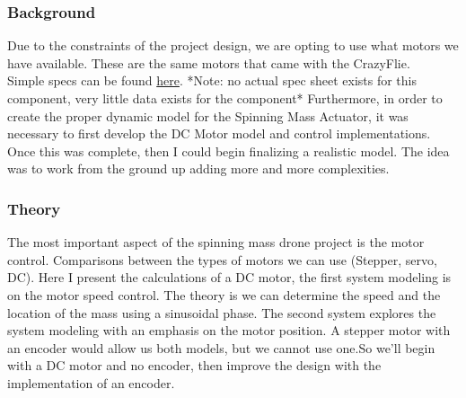 	\subsubsection{Background}
    \indent Due to the constraints of the project design, we are opting to use what motors we have available. These are the same motors that came with the CrazyFlie. \\
Simple specs can be found \href{https://store.bitcraze.io/collections/spare-parts/products/7-mm-dc-motor}{here}.
*Note: no actual spec sheet exists for this component, very little data exists for the component*
Furthermore, in order to create the proper dynamic model for the Spinning Mass Actuator, it was necessary to first develop the DC Motor model and control implementations. Once this was complete, then I could begin finalizing a realistic model. The idea was to work from the ground up adding more and more complexities.
	\subsubsection{Theory}
    \indent The most important aspect of the spinning mass drone project is the motor control. Comparisons between the types of motors we can use (Stepper, servo, DC). Here I present the calculations of a DC motor, the first system modeling is on the motor speed control. The theory is we can determine the speed and the location of the mass using a sinusoidal phase. The second system explores the system modeling with an emphasis on the motor position. A stepper motor with an encoder would allow us both models, but we cannot use one.So we'll begin with a DC motor and no encoder, then improve the design with the implementation of an encoder.
